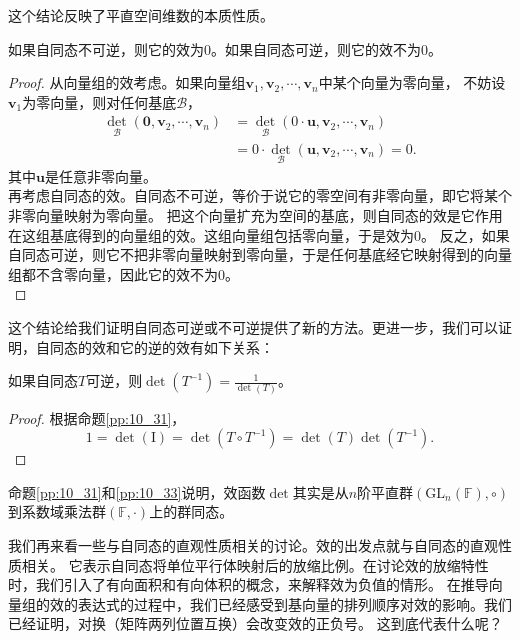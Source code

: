 \documentclass[12pt,UTF8,fontset=none]{ctexbook}
\begin{document}
这个结论反映了平直空间维数的本质性质。

\begin{pp}\label{pp:10_32}
    如果自同态不可逆，则它的效为$0$。如果自同态可逆，则它的效不为$0$。
\end{pp}
\begin{proof} %
    从向量组的效考虑。如果向量组$\mathbf{v}_1, \mathbf{v}_2, \cdots, \mathbf{v}_n$中某个向量为零向量，
    不妨设$\mathbf{v}_1$为零向量，则对任何基底$\mathcal{B}$，
    \begin{align*}
        \det_\mathcal{B} (\mathbf{0}, \mathbf{v}_2, \cdots, \mathbf{v}_n) &= \det_\mathcal{B} (0\cdot \mathbf{u}, \mathbf{v}_2, \cdots, \mathbf{v}_n)  \\
        &= 0\cdot \det_\mathcal{B} (\mathbf{u}, \mathbf{v}_2, \cdots, \mathbf{v}_n) = 0.  
    \end{align*}
    其中$\mathbf{u}$是任意非零向量。\\
    再考虑自同态的效。自同态不可逆，等价于说它的零空间有非零向量，即它将某个非零向量映射为零向量。
    把这个向量扩充为空间的基底，则自同态的效是它作用在这组基底得到的向量组的效。这组向量组包括零向量，于是效为$0$。
    反之，如果自同态可逆，则它不把非零向量映射到零向量，于是任何基底经它映射得到的向量组都不含零向量，因此它的效不为$0$。\\
\end{proof}

这个结论给我们证明自同态可逆或不可逆提供了新的方法。更进一步，我们可以证明，自同态的效和它的逆的效有如下关系：
\begin{pp}\label{pp:10_33}
    如果自同态$T$可逆，则$\det(T^{-1}) = \frac{1}{\det(T)}$。
\end{pp}
\begin{proof} %
    根据命题\ref{pp:10_31}，
    $$1 = \det(\mathrm{I}) = \det(T\circ T^{-1}) = \det(T) \det(T^{-1}).$$
\end{proof}

命题\ref{pp:10_31}和\ref{pp:10_33}说明，效函数$\det$其实是从$n$阶平直群$(\mathrm{GL}_n(\mathbb{F}), \circ)$到系数域乘法群$(\mathbb{F}, \cdot)$上的群同态。

我们再来看一些与自同态的直观性质相关的讨论。效的出发点就与自同态的直观性质相关。
它表示自同态将单位平行体映射后的放缩比例。在讨论效的放缩特性时，我们引入了有向面积和有向体积的概念，来解释效为负值的情形。
在推导向量组的效的表达式的过程中，我们已经感受到基向量的排列顺序对效的影响。我们已经证明，对换（矩阵两列位置互换）会改变效的正负号。
这到底代表什么呢？
\end{document}
